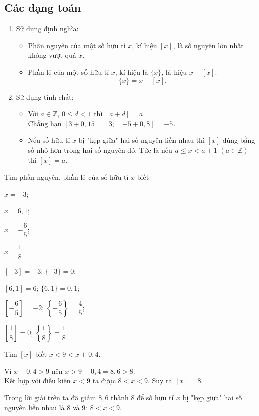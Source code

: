\subsection{Các dạng toán}
\begin{dang}
	\begin{enumerate}[\tickEX]
		\item Sử dụng định nghĩa:
		\begin{itemize}
			\item Phần nguyên của một số hữu tỉ $x$, kí hiệu $[x]$, là số nguyên lớn nhất không vượt quá $x$.
			\item Phần lẻ của một số hữu tỉ $x$, kí hiệu là $\{x\}$, là hiệu $x-[x]$.
			$$\{x\}=x-[x].$$
		\end{itemize}
		\item Sử dụng tính chất:
	\begin{itemize}
		\item Với $a\in\mathbb{Z}$, $0\le d<1$ thì $\left[ a + d \right] = a$.\\
		Chẳng hạn $\left[ 3 + 0,15 \right] = 3;\,\,\left[  - 5 + 0,8 \right] =  - 5$.
		\item Nếu số hữu tỉ $x$ bị "kẹp giữa" hai số nguyên liền nhau thì $[x]$ đúng bằng số nhỏ hơn trong hai số nguyên đó. Tức là nếu $a \le x < a + 1\,\,(a \in \mathbb{Z})$ thì $[x]=a$. 
	\end{itemize}
	\end{enumerate}
\end{dang}
\begin{vd}
Tìm phần nguyên, phần lẻ của số hữu tỉ $x$ biết
	\begin{listEX}[4]
		\item $x=-3$;
		\item $x=6,1$;
		\item $x=-\dfrac{6}{5}$;
		\item $x=\dfrac{1}{8}$.
	\end{listEX}
	\loigiai
	{
	\begin{listEX}[2]
		\item $[-3]=-3$; $\{-3\}=0$;
		\item $[6,1]=6$; $\{6,1\}=0,1$;
		\item $\left[-\dfrac{6}{5}\right]=-2$; $\left\{-\dfrac{6}{5}\right\}=\dfrac{4}{5}$;
		\item $\left[\dfrac{1}{8} \right]=0$; $\left\{\dfrac{1}{8}\right\}=\dfrac{1}{8}$.
	\end{listEX}
	}
\end{vd}
\begin{vd}\label{nglec1}
	Tìm $[x]$ biết $x<9<x+0,4$.
	\loigiai
	{
Vì $x+0,4>9$ nên $x>9-0,4=8,6>8$. \\
		Kết hợp với điều kiện $x<9$ ta được $8<x<9$. Suy ra $[x]=8$.
		\begin{note}
			Trong lời giải trên ta đã giảm $8,6$ thành $8$ để số hữu tỉ $x$ bị "kẹp giữa" hai số nguyên liền nhau là $8$ và $9$: $8<x<9$.
		\end{note}
	}
\end{vd}

